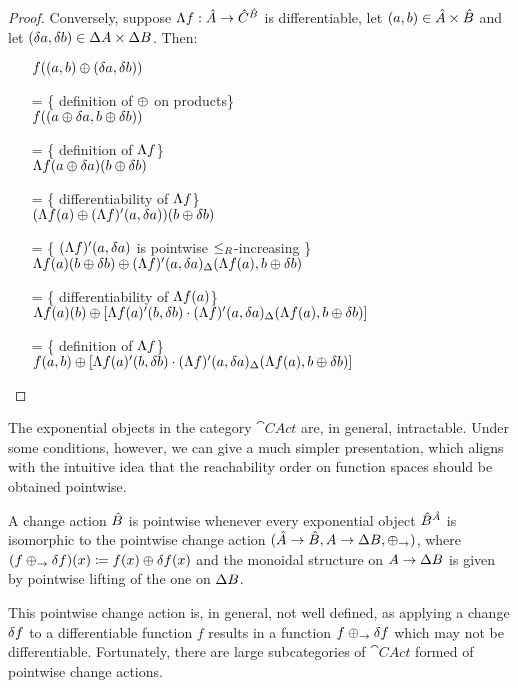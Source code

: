 \begin{proof}
  Conversely, suppose $\Lambda{f} : \hat{A} \rightarrow \hat{C}^{\hat{B}}$ is differentiable, let $(a, b) \in \hat{A} \times \hat{B}$
  and let $(\delta a, \delta b) \in \Delta A \times \Delta B$. Then:
  \begin{itemize}
    \item[ ]$f((a, b) \oplus (\delta a, \delta b))$
    \item[=]\{ definition of $\oplus$ on products\}\\
    $f((a \oplus \delta a, b \oplus \delta b))$
    \item[=]\{ definition of $\Lambda{f}$\}\\
    $\Lambda{f}(a \oplus \delta a)(b \oplus \delta b)$
    \item[=]\{ differentiability of $\Lambda{f}$\}\\
    $(\Lambda{f}(a) \oplus (\Lambda{f})'(a, \delta a))(b \oplus \delta b)$
    \item[=]\{ $(\Lambda{f})'(a, \delta a)$ is pointwise $\leq_R$-increasing \}\\
    $\Lambda{f}(a)(b \oplus \delta b) \oplus (\Lambda{f})'(a, \delta a)_\Delta(\Lambda{f}(a), b \oplus \delta b)$
    \item[=]\{ differentiability of $\Lambda{f}(a)$\}\\
    $\Lambda{f}(a)(b) \oplus [ \Lambda{f}(a)'(b, \delta b) \cdot (\Lambda{f})'(a, \delta a)_\Delta(\Lambda{f}(a), b \oplus \delta b) ]$
    \item[=]\{ definition of $\Lambda{f}$\}\\
    $f(a, b) \oplus [ \Lambda{f}(a)'(b, \delta b) \cdot (\Lambda{f})'(a, \delta a)_\Delta(\Lambda{f}(a), b \oplus \delta b) ]$
  \end{itemize}
\end{proof}
\fi
\fi

The exponential objects in the category $\cat{CAct}$ are, in general, intractable. Under some
conditions, however, we can give a much simpler presentation, which aligns with the intuitive
idea that the reachability order on function spaces should be obtained pointwise.
\begin{defn}
  A change action $\hat{B}$ is pointwise whenever every exponential object
  $\hat{B}^{\hat{A}}$ is isomorphic to the pointwise change action
  $(\hat{A} \rightarrow \hat{B},A \rightarrow \Delta B,\oplus_\rightarrow)$,
  where $(f \oplus_\rightarrow \delta f)(x) \coloneqq f(x) \oplus \delta f(x)$ and the
  monoidal structure on $A \rightarrow \Delta B$ is given by pointwise lifting
  of the one on $\Delta B$.
\end{defn}
This pointwise change action is, in general, not well defined, as applying a change $\delta f$ to
a differentiable function $f$ results in a function $f \oplus_\rightarrow \delta f$ which
may not be differentiable.
Fortunately, there are large subcategories of $\cat{CAct}$ formed of pointwise change actions.

